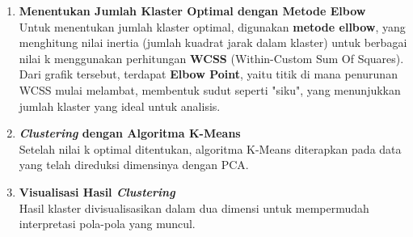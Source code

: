 \documentclass[english,12pt,a4paper,openany]{book}
\begin{document}
\begin{enumerate}
		\item \textbf{Menentukan Jumlah Klaster Optimal dengan Metode Elbow}\\
		Untuk menentukan jumlah klaster optimal, digunakan \textbf{metode ellbow}, yang menghitung nilai inertia (jumlah kuadrat jarak dalam klaster) untuk berbagai nilai k menggunakan perhitungan \textbf{WCSS} (Within-Custom Sum Of Squares). Dari grafik tersebut, terdapat \textbf{Elbow Point}, yaitu titik di mana penurunan WCSS mulai melambat, membentuk sudut seperti "siku", yang menunjukkan jumlah klaster yang ideal untuk analisis.
		
		\item \textbf{\textit{Clustering} dengan Algoritma K-Means}\\
		Setelah nilai k optimal ditentukan, algoritma K-Means diterapkan pada data yang telah direduksi dimensinya dengan PCA.
		
		\item \textbf{Visualisasi Hasil \textit{Clustering}}\\
		Hasil klaster divisualisasikan dalam dua dimensi untuk mempermudah interpretasi pola-pola yang muncul.
	\end{enumerate}
	
	
\end{document}
